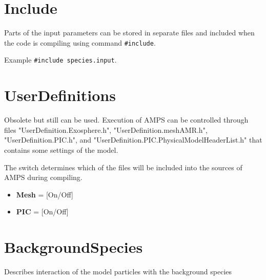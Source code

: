 \section{Include}

Parts of the input parameters can be stored in separate files and included when the code is compiling using command {\tt \#include}. 

Example {\tt \#include species.input}.


\section{UserDefinitions}
Obsolete but still can be used. Execution of AMPS can be controlled through files "UserDefinition.Exosphere.h", "UserDefinition.meshAMR.h", "UserDefinition.PIC.h", and "UserDefinition.PIC.PhysicalModelHeaderList.h" that contains some settings of the model.

The switch determines which of the files will be included into the sources of AMPS during compiling.

\begin{itemize}
\item {\bf Mesh} = [On/Off]
\item {\bf PIC} = [On/Off]
\end{itemize}


\section{BackgroundSpecies} 
Describes interaction of the model particles with the background species


